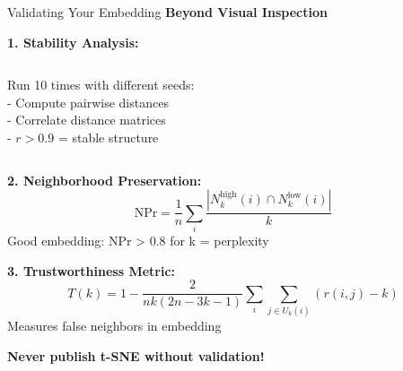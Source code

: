 \documentclass[10pt]{beamer}
\newcommand{\emphtext}[1]{\textcolor{upcblue}{\textbf{#1}}}
\newcommand{\warningbox}[1]{\colorbox{red!10}{\begin{minipage}{0.85\textwidth}\centering #1\end{minipage}}}
\begin{document}
\begin{frame}{Validating Your Embedding}
\emphtext{Beyond Visual Inspection}

\vspace{0.3cm}
\textbf{1. Stability Analysis:}
\begin{columns}[T]
\begin{column}{0.48\textwidth}
\footnotesize
Run 10 times with different seeds:\\
- Compute pairwise distances\\
- Correlate distance matrices\\
- $r > 0.9$ = stable structure
\end{column}

\begin{column}{0.48\textwidth}
\end{column}
\end{columns}

\vspace{0.3cm}
\textbf{2. Neighborhood Preservation:}
$$\text{NPr} = \frac{1}{n}\sum_i \frac{|N_k^{\text{high}}(i) \cap N_k^{\text{low}}(i)|}{k}$$
\footnotesize Good embedding: NPr > 0.8 for k = perplexity

\vspace{0.3cm}
\textbf{3. Trustworthiness Metric:}
$$T(k) = 1 - \frac{2}{nk(2n-3k-1)}\sum_i \sum_{j \in U_k(i)} (r(i,j) - k)$$
\footnotesize Measures false neighbors in embedding

\begin{center}
\warningbox{\footnotesize\textbf{Never publish t-SNE without validation!}}
\end{center}
\end{frame}


\end{document}
